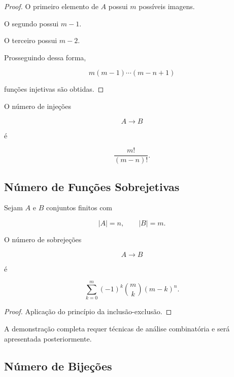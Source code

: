 \documentclass[../../main]{subfiles}
\begin{document}
\begin{proof}

	O primeiro elemento de \(A\) possui \(m\) possíveis imagens.

	O segundo possui \(m-1\).

	O terceiro possui \(m-2\).

	Prosseguindo dessa forma,

	\[
		m(m-1)\cdots(m-n+1)
	\]

	funções injetivas são obtidas.

\end{proof}

\begin{cor}

	O número de injeções

	\[
		A\to B
	\]

	é

	\[
		\frac{m!}{(m-n)!}.
	\]

\end{cor}

\subsection{Número de Funções Sobrejetivas}

\begin{prop}
	\label{prop:matematica:funcoes:cardinalidade:sobrejetivas}

	Sejam \(A\) e \(B\) conjuntos finitos com

	\[
		|A|=n,
		\qquad
		|B|=m.
	\]

	O número de sobrejeções

	\[
		A\to B
	\]

	é

	\[
		\sum_{k=0}^{m}
		(-1)^k
		\binom{m}{k}
		(m-k)^n.
	\]

\end{prop}

\begin{proof}

	Aplicação do princípio da inclusão-exclusão.

\end{proof}

\begin{obs}

	A demonstração completa requer técnicas de análise combinatória e
	será apresentada posteriormente.

\end{obs}

\subsection{Número de Bijeções}
\end{document}
